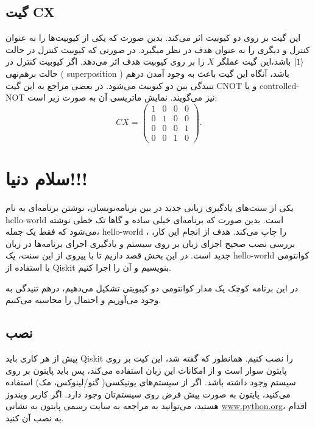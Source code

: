 \documentclass[a4paper,11pt,oneside,openany]{iut-thesis}
\begin{document}
\subsection{
گیت CX
}
این گیت بر روی دو کیوبیت اثر می‌کند. بدین صورت که یکی از کیوبیت‌ها را به عنوان کنترل و دیگری را به عنوان هدف در نظر میگیرد. در صورتی که کیوبیت کنترل در حالت $ \ket 1 $ باشد،‌این گیت عملگر $ X $ را بر روی کیوبیت هدف اثر می‌دهد. اگر کیوبیت کنترل در حالت برهم‌نهی ( superposition ) باشد، آنگاه این گیت باعث به وجود آمدن درهم تنیدگی بین دو کیوبیت می‌شود. در بعضی مراجع به این گیت CNOT و یا controlled-NOT نیز می‌گویند. نمایش ماتریسی آن به صورت زیر است:
\begin{equation}
CX =  \begin{pmatrix} 1 & 0 & 0 & 0 \\ 0 & 1 & 0 & 0 \\ 0&0&0&1 \\ 0&0&1&0 \end{pmatrix}.
\end{equation}







\section{
سلام دنیا!!!
}
یکی از سنت‌های یادگیری زبانی جدید در بین برنامه‌نویسان، نوشتن برنامه‌ای به نام hello-world است. بدین صورت که برنامه‌ای خیلی ساده و گاها تک خطی نوشته می‌شود که فقط یک جمله، hello-world ، را چاپ می‌کند. هدف از انجام این کار، بررسی نصب صحیح اجزای زبان بر روی سیستم و یادگیری اجرای برنامه‌ها در زبان جدید است. در این بخش قصد داریم تا با پیروی از این سنت، یک hello-world کوانتومی با استفاده از Qiskit بنویسیم و آن را اجرا کنیم.

در این برنامه کوچک یک مدار کوانتومی دو کیبویتی تشکیل می‌دهیم، درهم تنیدگی به وجود می‌آوریم و احتمال را محاسبه می‌کنیم.
\subsection{
نصب
}
پیش از هر کاری باید Qiskit را نصب کنیم. همانطور که گفته شد، این کیت بر روی پایتون سوار است و از امکانات این زبان استفاده می‌کند، پس باید پایتون بر روی سیستم وجود داشته باشد. اگر از سیستم‌های یونیکسی( گنو/لینوکس، مک) استفاده می‌کنید، پایتون به صورت پیش فرض روی سیستم‌تان وجود دارد. اگر کاربر ویندوز هستید، می‌توانید به مراجعه به سایت رسمی پایتون به نشانی \url{www.python.org}، اقدام به نصب آن کنید.
\end{document}
